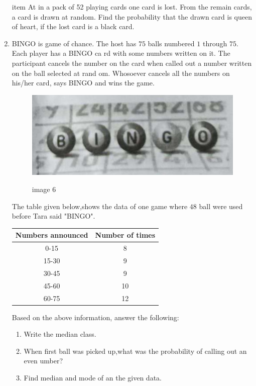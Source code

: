 \begin{enumerate}
item At in a pack of 52 playing cards one card is lost. From the remain cards, a card is drawn at random.
Find the probability that the drawn card is queen of heart, if the lost card is a black card.
\item BINGO is game of chance. The host has $75$ balls numbered $1$ through $75$. Each player has a BINGO ca
rd with some numbers written on it.
The participant cancels the number on the card when called out a number written on the ball selected at rand
om. Whosoever cancels all the numbers on his/her card, says BINGO and wins the game.

\begin{figure}[!ht]
\centering
	\includegraphics[width=\columnwidth]{figs/p1.jpg}
\label{fig:image 6}
\caption{image 6}
\end{figure}

\text The table given below,shows the data of one game where $48$ ball were used before Tara said "BINGO".
\begin{center}
\begin{tabular}{|c|c|}
\hline
Numbers announced & Number of times \\
\hline
0-15 & 8 \\
\hline
15-30 & 9 \\
\hline
30-45 & 9 \\
\hline
45-60 & 10 \\
\hline
60-75 & 12 \\ 
	\hline
\end{tabular}
\end{center}
 Based on the above information, answer the following:\
\begin{enumerate}
\item Write the median class.\
\item When first ball was picked up,what was the probability of calling out an even umber?\
\item Find median and mode of an the given data.
\end{enumerate}




\end{enumerate}
